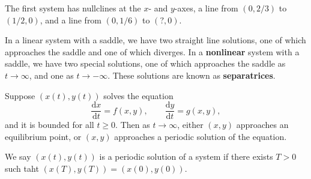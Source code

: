 The first system has nullclines at the $x$- and $y$-axes, a line from $(0,2 /3)$ to $(1 /2,0)$, and a line from $(0,1 /6)$ to $(?,0)$.

In a linear system with a saddle, we have two straight line solutions, one of which approaches the saddle and one of which diverges. In a \textbf{nonlinear} system with a saddle, we have two special solutions, one of which approaches the saddle as $t\to \infty$, and one as $t\to -\infty$. These solutions are known as \textbf{separatrices}.

\begin{theorem}\label{thm:idkLOL}
	Suppose $(x(t),y(t))$ solves the equation
	\[
		\frac{\mathrm{d}x}{\mathrm{d}t} =f(x,y),\qquad \frac{\mathrm{d}y}{\mathrm{d}t} =g(x,y)
	,\]
	and it is bounded for all $t\geq 0$. Then as $t\to \infty$, either $(x,y)$ approaches an equilibrium point, or $(x,y)$ approaches a periodic solution of the equation.
\end{theorem}

\begin{definition}\label{dfn:askjn}
	We say $(x(t),y(t))$ is a periodic solution of a system if there exists $T>0$ such taht $(x(T),y(T))=(x(0),y(0))$.
	
\end{definition}
